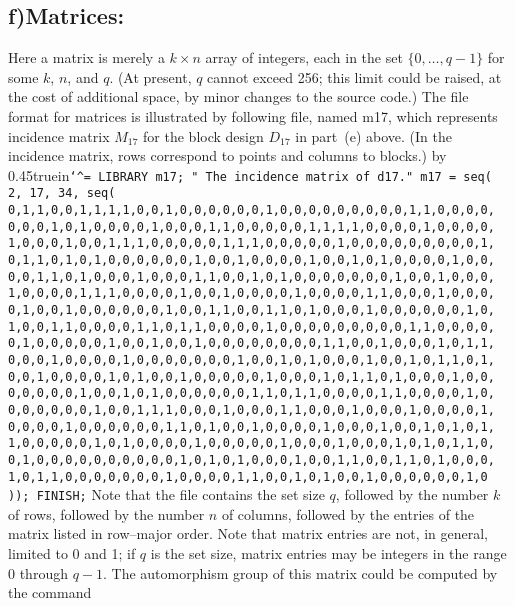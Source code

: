 \subsection{f)\enskip Matrices:}Here a matrix is merely a $k\times n$
array of integers, each in the set $\{0,\ldots,q-1\}$ for some $k$, $n$, and
$q$.  (At present, $q$ cannot exceed 256; this limit could be raised, at the
cost of additional space, by minor changes to the source code.)
The file format for matrices is
illustrated by following file, named {\filenamefont m17},
which represents incidence matrix $M_{17}$ for the block design $D_{17}$
in part~(e) above.  (In the incidence matrix, rows correspond to points and
columns to blocks.)
\medbreak
\vbox{{\elevenpoint\advance\leftskip by 0.45truein\obeywhitespace\tt\catcode`^=\other
LIBRARY m17;
" The incidence matrix of d17."
m17 = seq( 2, 17, 34, seq(
       0,1,1,0,0,1,1,1,1,0,0,1,0,0,0,0,0,0,1,0,0,0,0,0,0,0,0,0,1,1,0,0,0,0,
       0,0,0,1,0,1,0,0,0,0,1,0,0,0,1,1,0,0,0,0,0,1,1,1,1,0,0,0,0,1,0,0,0,0,
       1,0,0,0,1,0,0,1,1,1,0,0,0,0,0,1,1,1,0,0,0,0,0,1,0,0,0,0,0,0,0,0,0,1,
       0,1,1,0,1,0,1,0,0,0,0,0,0,1,0,0,1,0,0,0,0,1,0,0,1,0,1,0,0,0,0,1,0,0,
       0,0,1,1,0,1,0,0,0,1,0,0,0,1,1,0,0,1,0,1,0,0,0,0,0,0,0,1,0,0,1,0,0,0,
       1,0,0,0,0,1,1,1,0,0,0,0,1,0,0,1,0,0,0,0,1,0,0,0,0,1,1,0,0,0,1,0,0,0,
       0,1,0,0,1,0,0,0,0,0,0,1,0,0,1,1,0,0,1,1,0,1,0,0,0,1,0,0,0,0,0,0,1,0,
       1,0,0,1,1,0,0,0,0,1,1,0,1,1,0,0,0,0,1,0,0,0,0,0,0,0,0,0,1,1,0,0,0,0,
       0,1,0,0,0,0,0,1,0,0,1,0,0,1,0,0,0,0,0,0,0,0,1,1,0,0,1,0,0,0,1,0,1,1,
       0,0,0,1,0,0,0,0,1,0,0,0,0,0,0,0,1,0,0,1,0,1,0,0,0,1,0,0,1,0,1,1,0,1,
       0,0,1,0,0,0,0,1,0,1,0,0,1,0,0,0,0,0,1,0,0,0,1,0,1,1,0,1,0,0,0,1,0,0,
       0,0,0,0,0,1,0,0,1,0,1,0,0,0,0,0,0,1,1,0,1,1,0,0,0,0,1,1,0,0,0,0,1,0,
       0,0,0,0,0,0,1,0,0,1,1,1,0,0,0,1,0,0,0,1,1,0,0,0,1,0,0,0,1,0,0,0,0,1,
       0,0,0,0,1,0,0,0,0,0,0,1,1,0,1,0,0,1,0,0,0,0,1,0,0,0,1,0,0,1,0,1,0,1,
       1,0,0,0,0,0,1,0,1,0,0,0,0,1,0,0,0,0,0,1,0,0,0,1,0,0,0,1,0,1,0,1,1,0,
       0,1,0,0,0,0,0,0,0,0,0,0,1,0,1,0,1,0,0,0,1,0,0,1,1,0,0,1,1,0,1,0,0,0,
       1,0,1,1,0,0,0,0,0,0,0,1,0,0,0,0,1,1,0,0,1,0,1,0,0,1,0,0,0,0,0,0,1,0
      ));
FINISH;\vskip0pt}}
\medbreak
Note that the file contains the set size $q$, followed by the number $k$ of rows,
followed by the number $n$ of columns, followed by the entries of the matrix
listed in row--major order.  Note that matrix entries are not, in general,
limited to 0 and 1; if $q$ is the set size, matrix entries may be integers
in the range 0 through $q-1$.
\medbreak
The automorphism group of this matrix could be computed by the command
